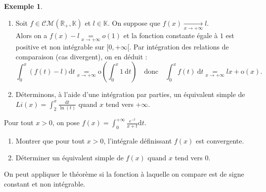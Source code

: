\documentclass[french]{article}
\newcommand{\R}{\mathbb{R}}
\newcommand{\K}{\mathbb{K}}
\renewcommand{\o}{\text{o}}
\renewcommand{\d}{\text{d}}
\theoremstyle{plain}
\theoremstyle{definition}
\newtheorem*{ex}{Exemple}
\theoremstyle{remark}
\begin{document}
\begin{ex}
	\begin{enumerate}
		\item Soit $f\in\mathcal{CM}(\R_+,\K)$ et $l\in\K$. On suppose que $f(x)\xrightarrow[x\to+\infty]{}l$.\\
		Alors on a $f(x)-l\underset{x\to+\infty}{=}o(1)$ et la fonction constante égale à $1$ est positive et non intégrable sur $[0,+\infty[$. Par intégration des relations de comparaison (cas divergent), on en déduit : $$\int_{0}^{x}(f(t)-l)\d t\underset{x\to+\infty}{=}\o\left(\int_{0}^{x}1\ \d t\right)\quad\text{donc}\quad\int_{0}^{x}f(t)\ \d t\underset{x\to+\infty}{=}lx+\o(x).$$
		\item Déterminons, à l'aide d'une intégration par parties, un équivalent simple de $\displaystyle Li(x)=\int_{2}^{x}\frac{\d t}{\ln(t)}$ quand $x$ tend vers $+\infty$.
	\end{enumerate}
\end{ex}

\begin{exo}
	Pour tout $x>0$, on pose $f(x)=\displaystyle\int_{0}^{+\infty}\frac{e^{-t}}{x+t}\d t$.
	\begin{enumerate}
		\item Montrer que pour tout $x>0$, l'intégrale définissant $f(x)$ est convergente.
		\item Déterminer un équivalent simple de $f(x)$ quand $x$ tend vers $0$.
	\end{enumerate}
\end{exo}

\begin{met}
	On peut appliquer le théorème si la fonction à laquelle on compare est de signe constant et non intégrable.
\end{met}
\end{document}
